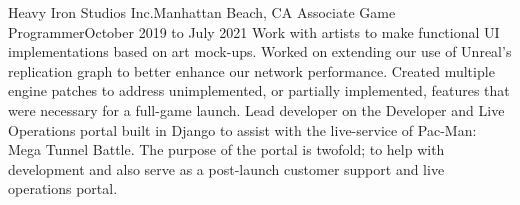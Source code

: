 

\experienceHeading
{Heavy Iron Studios Inc.}{Manhattan Beach, CA}
{Associate Game Programmer}{October 2019 to July 2021}
\experienceStart
        {Work with artists to make functional UI implementations based on art mock-ups.}
        {Worked on extending our use of Unreal's replication graph to better enhance our network performance.}
        {Created multiple engine patches to address unimplemented, or partially implemented, features that were necessary for a full-game launch.}
        {Lead developer on the Developer and Live Operations portal built in Django to assist with the live-service of Pac-Man: Mega Tunnel Battle. The purpose of the portal is twofold; to help with development and also serve as a post-launch customer support and live operations portal.}
\experienceEnd